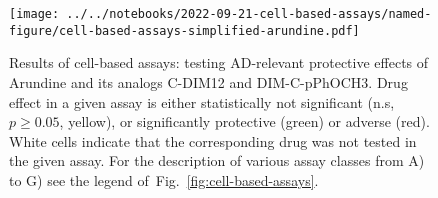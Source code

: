 \documentclass[letterpaper]{article}
\begin{document}
\begin{figure}[p]
\texttt{[image: ../../notebooks/2022-09-21-cell-based-assays/named-figure/cell-based-assays-simplified-arundine.pdf]}
\caption{Results of cell-based assays: testing AD-relevant protective effects
  of Arundine and its analogs C-DIM12 and DIM-C-pPhOCH3.
  Drug effect in a given assay is either statistically not significant (n.s,
  $p \ge 0.05$, yellow), or significantly protective (green) or adverse (red).
  White cells indicate that the corresponding drug was not tested in the given
  assay.  For the description of various assay classes from A) to G) see the
  legend of~Fig.~\ref{fig:cell-based-assays}.
}
\label{fig:arundine-analogs}
\end{figure}
\end{document}
